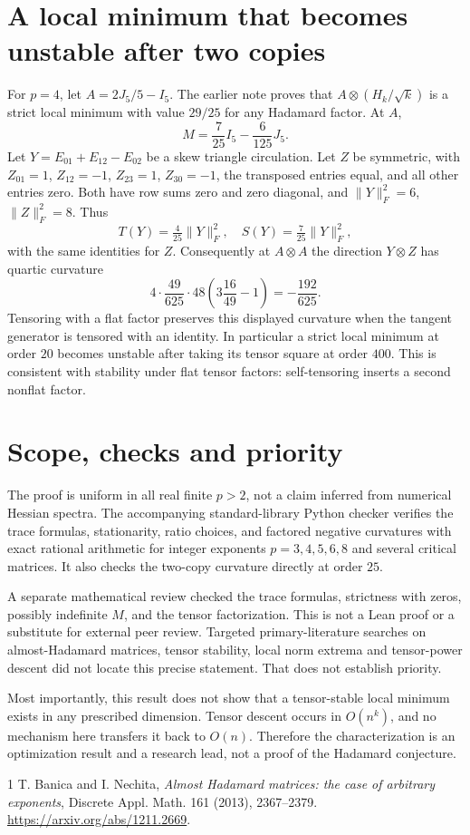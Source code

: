 \documentclass[11pt]{article}
\begin{document}
\section{A local minimum that becomes unstable after two copies}
For $p=4$, let $A=2J_5/5-I_5$. The earlier note proves that
$A\otimes(H_k/\sqrt k)$ is a strict local minimum with value $29/25$
for any Hadamard factor. At $A$,
\[
 M=\frac7{25}I_5-\frac6{125}J_5.
\]
Let $Y=E_{01}+E_{12}-E_{02}$ be a skew triangle circulation. Let $Z$
be symmetric, with $Z_{01}=1$, $Z_{12}=-1$, $Z_{23}=1$,
$Z_{30}=-1$, the transposed entries equal, and all other entries zero.
Both have row sums zero and zero diagonal, and
$\|Y\|_F^2=6$, $\|Z\|_F^2=8$. Thus
\[
 T(Y)=\tfrac4{25}\|Y\|_F^2,\quad
 S(Y)=\tfrac7{25}\|Y\|_F^2,
\]
with the same identities for $Z$. Consequently at $A\otimes A$ the
direction $Y\otimes Z$ has quartic curvature
\[
 4\cdot\frac{49}{625}\cdot48
 \left(3\frac{16}{49}-1\right)=-\frac{192}{625}.
\]
Tensoring with a flat factor preserves this displayed curvature when
the tangent generator is tensored with an identity. In particular a
strict local minimum at order $20$ becomes unstable after taking its
tensor square at order $400$. This is consistent with stability under
flat tensor factors: self-tensoring inserts a second nonflat factor.

\section{Scope, checks and priority}
The proof is uniform in all real finite $p>2$, not a claim inferred
from numerical Hessian spectra. The accompanying standard-library
Python checker verifies the trace formulas, stationarity, ratio choices,
and factored negative curvatures with exact rational arithmetic for
integer exponents $p=3,4,5,6,8$ and several critical matrices. It also
checks the two-copy curvature directly at order $25$.

A separate mathematical review checked the trace formulas, strictness
with zeros, possibly indefinite $M$, and the tensor factorization.
This is not a Lean proof or a substitute for external peer review.
Targeted primary-literature searches on almost-Hadamard matrices,
tensor stability, local norm extrema and tensor-power descent did not
locate this precise statement. That does not establish priority.

Most importantly, this result does not show that a tensor-stable local
minimum exists in any prescribed dimension. Tensor descent occurs in
$O(n^k)$, and no mechanism here transfers it back to $O(n)$. Therefore
the characterization is an optimization result and a research lead,
not a proof of the Hadamard conjecture.

\begin{thebibliography}{1}
 T. Banica and I. Nechita,
\emph{Almost Hadamard matrices: the case of arbitrary exponents},
Discrete Appl. Math. 161 (2013), 2367--2379.
\url{https://arxiv.org/abs/1211.2669}.
\end{thebibliography}
\end{document}
